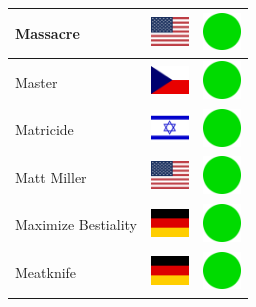 \documentclass[12pt, a4paper, twoside]{report}
\begin{document}
\begin{center}
\begin{longtable}{|p{5cm}|p{2cm}|p{2cm}|}
 Massacre                                                   & \includegraphics[width=1cm]{../4x3/us} &   \includegraphics[width=1cm]{../likes/y} \\ \hline
 Master                                                     & \includegraphics[width=1cm]{../4x3/cz} &   \includegraphics[width=1cm]{../likes/y} \\ \hline
 Matricide                                                  & \includegraphics[width=1cm]{../4x3/il} &   \includegraphics[width=1cm]{../likes/y} \\ \hline
 Matt Miller                                                & \includegraphics[width=1cm]{../4x3/us} &   \includegraphics[width=1cm]{../likes/y} \\ \hline
 Maximize Bestiality                                        & \includegraphics[width=1cm]{../4x3/de} &   \includegraphics[width=1cm]{../likes/y} \\ \hline
 Meatknife                                                  & \includegraphics[width=1cm]{../4x3/de} &   \includegraphics[width=1cm]{../likes/y} \\ \hline

\end{longtable}
\end{center}
\end{document}
